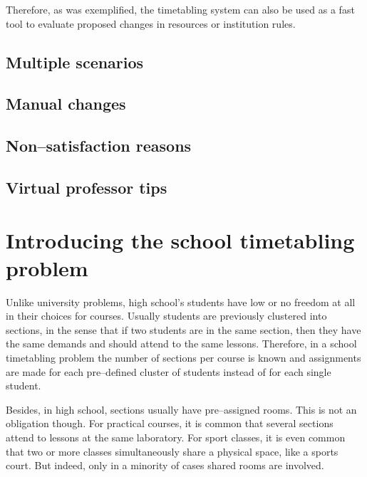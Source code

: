 Therefore, as was exemplified, the timetabling system can also be used as a fast  tool to evaluate proposed changes in resources or institution rules.


\subsection{Multiple scenarios}
\label{subsec:scenarios}


\subsection{Manual changes}
\label{subsec:manual}


\subsection{Non--satisfaction reasons}
\label{subsec:reasons}


\subsection{Virtual professor tips}
\label{subsec:tips}





\section{Introducing the school timetabling problem}
\label{deftriedaschool}


Unlike university problems, high school's students have low or no freedom at all in their choices for courses. Usually students are previously clustered into sections, in the sense that if two students are in the same section, then they have the same demands and should attend to the same lessons. Therefore, in a school timetabling problem the number of sections per course is known and assignments are made for each pre--defined cluster of students instead of for each single student.

Besides, in high school, sections usually have pre--assigned rooms. This is not an obligation though. For practical courses, it is common that several sections attend to lessons at the same laboratory. For sport classes, it is even common that two or more classes simultaneously share a physical space, like a sports court. But indeed, only in a minority of cases shared rooms are involved.

